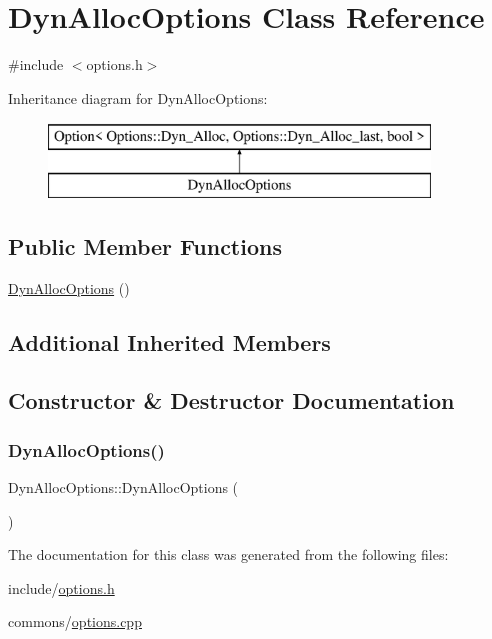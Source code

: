 \hypertarget{class_dyn_alloc_options}{}\section{Dyn\+Alloc\+Options Class Reference}
\label{class_dyn_alloc_options}


{\ttfamily \#include $<$options.\+h$>$}

Inheritance diagram for Dyn\+Alloc\+Options\+:\begin{figure}[H]
\begin{center}
\leavevmode
\includegraphics[height=2.000000cm]{d0/d53/class_dyn_alloc_options}
\end{center}
\end{figure}
\subsection*{Public Member Functions}
\begin{DoxyCompactItemize}
\item 
\mbox{\hyperlink{class_dyn_alloc_options_a4d10caca5e27f4e6c4dad119507e5b36}{Dyn\+Alloc\+Options}} ()
\end{DoxyCompactItemize}
\subsection*{Additional Inherited Members}


\subsection{Constructor \& Destructor Documentation}
\mbox{\label{class_dyn_alloc_options_a4d10caca5e27f4e6c4dad119507e5b36}} 
\subsubsection{\texorpdfstring{DynAllocOptions()}{DynAllocOptions()}}
{\footnotesize\ttfamily Dyn\+Alloc\+Options\+::\+Dyn\+Alloc\+Options (\begin{DoxyParamCaption}{ }\end{DoxyParamCaption})}



The documentation for this class was generated from the following files\+:\begin{DoxyCompactItemize}
\item 
include/\mbox{\hyperlink{options_8h}{options.\+h}}\item 
commons/\mbox{\hyperlink{options_8cpp}{options.\+cpp}}\end{DoxyCompactItemize}
